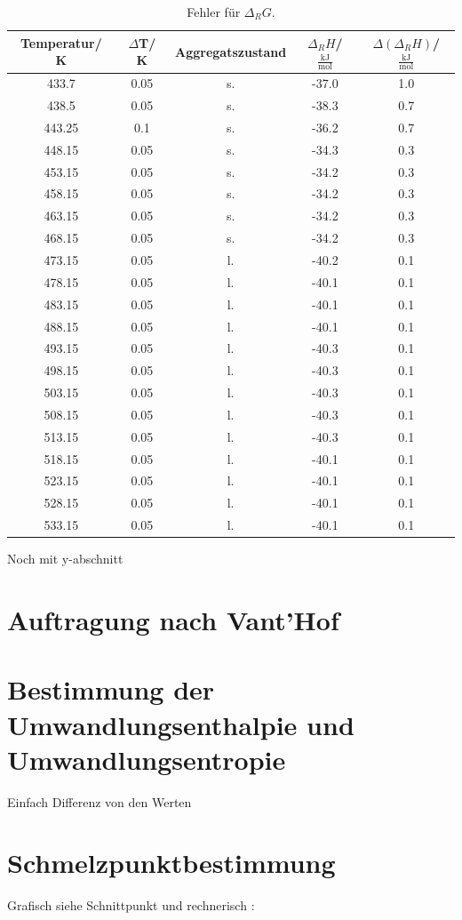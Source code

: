 \documentclass[12pt,a4paper,titlepage,headinclude,bibtotoc]{scrartcl}
\begin{document}
\begin{table}[h]
\centering
\caption{Fehler für $\Delta_R G$.}
\begin{tabular}{c|c|c|c|c}
Temperatur/ K & $\Delta$T/ K&Aggregatszustand&$\Delta_R H$/ \;$\frac{\text{kJ}}{\text{mol}}$ & $\Delta(\Delta_R H)$/ \;$\frac{\text{kJ}}{\text{mol}}$ \\
\hline
433.7 &  0.05 &  s. & -37.0 & 1.0\\
438.5 & 0.05   & s. & -38.3 &0.7 \\
443.25 & 0.1  & s. & -36.2&0.7\\
448.15 &  0.05& s. &-34.3&0.3\\
453.15 & 0.05& s. &-34.2&0.3\\
458.15 & 0.05& s. &-34.2&0.3\\
463.15 & 0.05& s. &-34.2&0.3\\
468.15 & 0.05& s. &-34.2&0.3\\
473.15 & 0.05& l. &-40.2&0.1\\
478.15 & 0.05& l. &-40.1&0.1\\
483.15 & 0.05& l. &-40.1&0.1\\
488.15 & 0.05& l. &-40.1&0.1\\
493.15 & 0.05& l. &-40.3&0.1\\
498.15 & 0.05& l. &-40.3&0.1\\
503.15 & 0.05& l. &-40.3&0.1\\
508.15 & 0.05& l. &-40.3&0.1\\
513.15 & 0.05& l. &-40.3&0.1\\
518.15 & 0.05& l. &-40.1&0.1\\
523.15 & 0.05& l. &-40.1&0.1\\
528.15 & 0.05& l. &-40.1&0.1\\
533.15 & 0.05& l. &-40.1&0.1\\
\end{tabular}
\end{table}
\FloatBarrier
Noch mit y-abschnitt
\section{Auftragung nach Vant'Hof}
\section{Bestimmung der Umwandlungsenthalpie und Umwandlungsentropie}
Einfach Differenz von den Werten 
\section{Schmelzpunktbestimmung}
Grafisch siehe Schnittpunkt
und rechnerisch :
\end{document}
